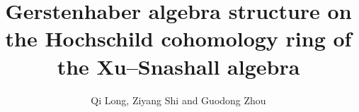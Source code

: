 \documentclass[10pt, reqno]{amsart}
\theoremstyle{definition}
\theoremstyle{remark}
\numberwithin{equation}{section}
\begin{document}
\setcounter{page}{1}


\newcommand{\calB}{\mathcal{B}}
\newcommand{\calG}{\mathcal{G}}
 \newcommand{\calP}{\mathcal{P}}
\newcommand{\calM}{\mathcal{M}}
\newcommand{\calN}{\mathcal{N}}
\newcommand{\calW}{\mathcal{W}}
\newcommand{\calD}{\mathcal{D}}
\newcommand{\calU}{\mathcal{U}}
\newcommand{\calS}{\mathcal{S}}
\newcommand{\T}{\mathcal{T}}

\newcommand{\id}{\mathrm{Id}}
\newcommand{\Span}{\mathrm{Span}}
\newcommand{\Nontip}{\mathrm{Nontip}}
\newcommand{\Tip}{\mathrm{Tip}}
\newcommand{\CTip}{\mathrm{CTip}}
\newcommand{\rmBar}{\mathrm{Bar}}
\newcommand{\Hom}{\mathrm{Hom}}
\newcommand{\Ker}{\mathrm{Ker}}
\newcommand{\rmIm}{\mathrm{Im}}

\newcommand{\rmChar}{\mathrm{Char}}


\newcommand{\rmH}{\mathrm{H}}
\newcommand{\rmHH}{\mathrm{HH}}









\title[Hochschild cohomology ring of the Xu--Snashall   algebra]{Gerstenhaber algebra structure on the Hochschild cohomology ring of the Xu--Snashall   algebra}

\author{Qi Long,  Ziyang Shi and Guodong Zhou}

\address{ 
	  School of Mathematical Sciences
     Key Laboratory of MEA (Ministry of Education),
	   Shanghai Key Laboratory of PMMP,
	  East China Normal University
	  Shanghai 200241,
	   P. R. China} 



\end{document}
